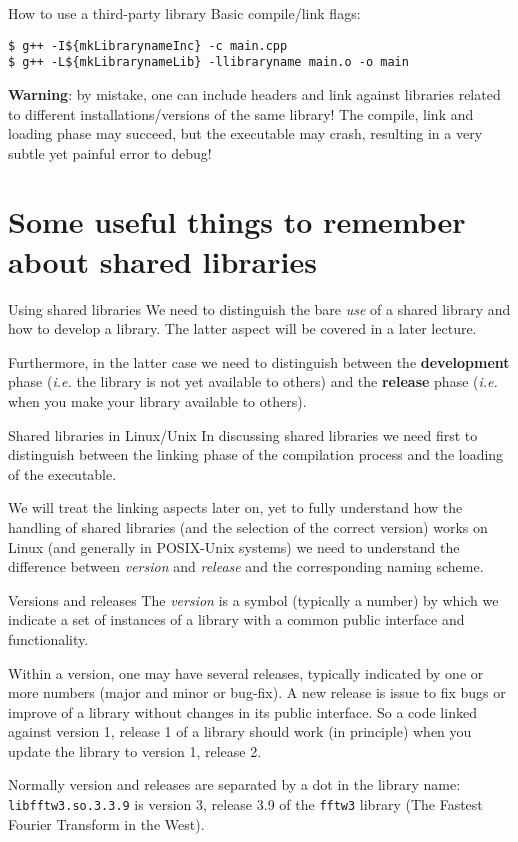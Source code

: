 \documentclass[10pt,aspectratio=169]{beamer}
\begin{document}
\begin{frame}[fragile]{How to use a third-party library}
  Basic compile/link flags:
\begin{verbatim}
$ g++ -I${mkLibrarynameInc} -c main.cpp
$ g++ -L${mkLibrarynameLib} -llibraryname main.o -o main
\end{verbatim}
\bigskip
\textbf{Warning}: by mistake, one can include headers and link against libraries related to different installations/versions of the same library! The compile, link and loading phase may succeed, but the executable may crash, resulting in a very subtle yet painful error to debug!
\end{frame}

\section{Some useful things to remember about shared libraries}

\begin{frame}{Using shared libraries}
  We need to distinguish the bare \emph{use} of a shared library and how
  to develop a library. The latter aspect will be covered in a later lecture.
  \medskip

  Furthermore, in the latter case we need to distinguish between the
  \textbf{development} phase (\textit{i.e.} the library is not yet available to others) and the \textbf{release} phase (\textit{i.e.} when you make your
  library available to others).
\end{frame}


\begin{frame}{Shared libraries in Linux/Unix} In
  discussing shared libraries we need first to distinguish between the
  linking phase of the compilation process and the loading of the
  executable. 
  \medskip

  We will treat the linking aspects later on, yet to fully understand
  how the handling of shared libraries (and the selection of the correct
  version) works on Linux (and generally in POSIX-Unix systems) we need
  to understand the difference between \emph{version} and \emph{release}
  and the corresponding naming scheme.
\end{frame}

\begin{frame}{Versions and releases} 
  The \emph{version} is a symbol
  (typically a number) by which we indicate a set of instances of a
  library with a common public interface and functionality.
  \smallskip

  Within a version, one may have several releases, typically indicated
  by one or more numbers (major and minor or bug-fix). A new release is 
  issue to fix bugs  or improve of a library without
  changes in its public interface. So a code linked against version 1,
  release 1 of a library should work (in principle) when you update
  the library to version 1, release 2.
  \smallskip

  Normally version and releases are separated by a dot in the library name:
  \texttt{libfftw3.so.3.3.9} is version 3, release 3.9 of the
  \texttt{fftw3} library (The Fastest Fourier Transform in the West).
\end{frame}
\end{document}
